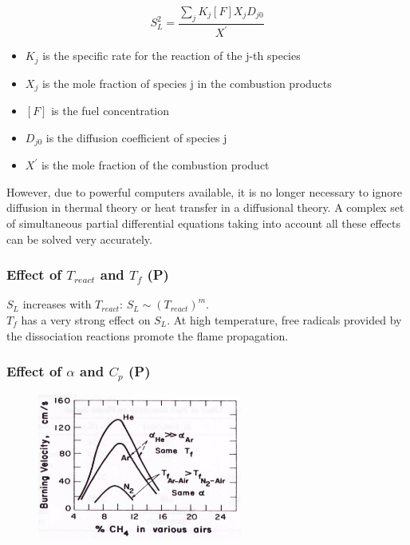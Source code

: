 \documentclass[12pt]{article}
\begin{document}
\begin{equation}
    S_{L}^{2} =\frac{\sum_{j}K_{j}[F]X_{j}D_{j0}}{X^{'}}
\end{equation}
\begin{itemize}
    \item $K_{j}$ is the specific rate for the reaction of the j-th species
    \item $X_{j}$ is the mole fraction of species j in the combustion products
    \item $[F]$ is the fuel concentration
    \item $D_{j0}$ is the diffusion coefficient of species j
    \item $X^{'}$ is the mole fraction of the combustion product
\end{itemize}

However, due to powerful computers available, it is no longer necessary to ignore diffusion in thermal theory or heat transfer in a diffusional theory. A complex set of simultaneous partial differential equations taking into account all these effects can be solved very accurately.

\subsubsection{Effect of $T_{react}$ and $T_{f}$ (P)}

$S_{L}$ increases with $T_{react}$: $S_{L}\sim (T_{react})^{m}$.\\
$T_{f}$ has a very strong effect on $S_{L}$. At high temperature, free radicals provided by the dissociation reactions promote the flame propagation.

\subsubsection{Effect of $\alpha$ and $C_{p}$ (P)}

\begin{figure}[h!]
\centering
\includegraphics[width=0.6\textwidth]{figures/speed.png}
\end{figure}
\end{document}
